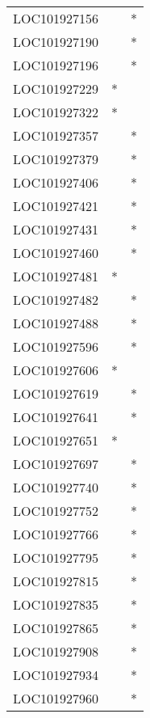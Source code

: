 \begin{longtable}{lcc}
LOC101927156    &                &          * \\
LOC101927190    &                &          * \\
LOC101927196    &                &          * \\
LOC101927229    &              * &            \\
LOC101927322    &              * &            \\
LOC101927357    &                &          * \\
LOC101927379    &                &          * \\
LOC101927406    &                &          * \\
LOC101927421    &                &          * \\
LOC101927431    &                &          * \\
LOC101927460    &                &          * \\
LOC101927481    &              * &            \\
LOC101927482    &                &          * \\
LOC101927488    &                &          * \\
LOC101927596    &                &          * \\
LOC101927606    &              * &            \\
LOC101927619    &                &          * \\
LOC101927641    &                &          * \\
LOC101927651    &              * &            \\
LOC101927697    &                &          * \\
LOC101927740    &                &          * \\
LOC101927752    &                &          * \\
LOC101927766    &                &          * \\
LOC101927795    &                &          * \\
LOC101927815    &                &          * \\
LOC101927835    &                &          * \\
LOC101927865    &                &          * \\
LOC101927908    &                &          * \\
LOC101927934    &                &          * \\
LOC101927960    &                &          * \\

\end{longtable}
